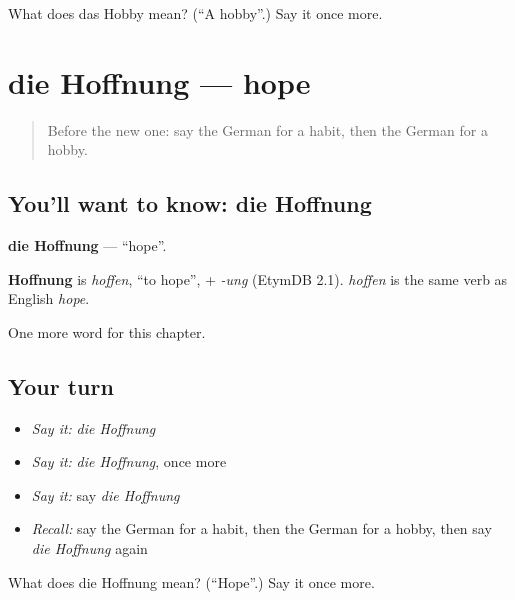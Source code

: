 \begin{tcolorbox}[breakable,colback=teal!4,colframe=teal!35!black,title={Before you move on}]
What does das Hobby mean? (\textquotedblleft{}A hobby\textquotedblright{}.) Say it once more.
\end{tcolorbox}
\section[die Hoffnung]{die Hoffnung — hope}

\label{lesson:GE-C231-hoffnung}



\begin{quote}
Before the new one: say the German for a habit, then the German for a hobby.
\end{quote}

\subsection*{You'll want to know: die Hoffnung}
\textbf{die Hoffnung} — \textquotedblleft{}hope\textquotedblright{}.

\begin{cousinweb}
\textbf{Hoffnung} is \emph{hoffen}, \textquotedblleft{}to hope\textquotedblright{}, + \emph{-ung} (EtymDB 2.1). \emph{hoffen} is the same verb as English \emph{hope}.
\end{cousinweb}

\begin{grammarlens}[title={What you've built}]
One more word for this chapter.
\end{grammarlens}

\subsection*{Your turn}
\begin{itemize}
\raggedright
  \item \emph{Say it:} \emph{die Hoffnung}
  \item \emph{Say it:} \emph{die Hoffnung}, once more
  \item \emph{Say it:} say \emph{die Hoffnung}
  \item \emph{Recall:} say the German for a habit, then the German for a hobby, then say \emph{die Hoffnung} again
\end{itemize}

\begin{tcolorbox}[breakable,colback=teal!4,colframe=teal!35!black,title={Before you move on}]
What does die Hoffnung mean? (\textquotedblleft{}Hope\textquotedblright{}.) Say it once more.
\end{tcolorbox}
